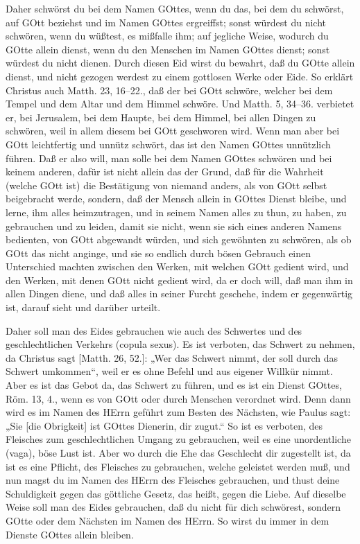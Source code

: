 Daher schwörst du bei dem Namen GOttes, wenn du das, bei dem du schwörst, auf GOtt beziehst und im Namen GOttes ergreiffst; sonst würdest du nicht schwören, wenn du wüßtest, es mißfalle ihm; auf jegliche Weise, wodurch du GOtte allein dienst, wenn du den Menschen im Namen GOttes dienst; sonst würdest du nicht dienen. Durch diesen Eid wirst du bewahrt, daß du GOtte allein dienst, und nicht gezogen werdest zu einem gottlosen Werke oder Eide. So erklärt Christus auch Matth. 23, 16–22., daß der bei GOtt schwöre, welcher bei dem Tempel und dem Altar und dem Himmel schwöre. Und Matth. 5, 34–36. verbietet er, bei Jerusalem, bei dem Haupte, bei dem Himmel, bei allen Dingen zu schwören, weil in allem diesem bei GOtt geschworen wird. Wenn man aber bei GOtt leichtfertig und unnütz schwört, das ist den Namen GOttes unnützlich führen. Daß er also will, man solle bei dem Namen GOttes schwören und bei keinem anderen, dafür ist nicht allein das der Grund, daß für die
Wahrheit (welche GOtt ist) die Bestätigung von niemand anders, als von GOtt selbst beigebracht werde, sondern, daß der Mensch allein in GOttes Dienst bleibe, und lerne, ihm alles heimzutragen, und in seinem Namen alles zu thun, zu haben, zu gebrauchen und zu leiden, damit sie nicht, wenn sie sich eines anderen Namens bedienten, von GOtt abgewandt würden, und sich gewöhnten zu schwören, als ob GOtt das nicht anginge, und sie so endlich durch bösen Gebrauch einen Unterschied machten zwischen den Werken, mit welchen GOtt gedient wird, und den Werken, mit denen GOtt nicht gedient wird, da er doch will, daß man ihm in allen Dingen diene, und daß alles in seiner Furcht geschehe, indem er gegenwärtig ist, darauf sieht und darüber urteilt.

Daher soll man des Eides gebrauchen wie auch des Schwertes und des geschlechtlichen Verkehrs (copula sexus). Es ist verboten, das Schwert zu nehmen, da Christus sagt [Matth. 26, 52.]: „Wer das Schwert nimmt, der soll durch das Schwert umkommen“, weil er es ohne Befehl und aus eigener Willkür nimmt. Aber es ist das Gebot da, das Schwert zu führen, und es ist ein Dienst GOttes, Röm. 13, 4., wenn es von GOtt oder durch Menschen verordnet wird. Denn dann wird es im Namen des HErrn geführt zum Besten des Nächsten, wie Paulus sagt: „Sie [die Obrigkeit] ist GOttes Dienerin, dir zugut.“ So ist es verboten, des Fleisches zum geschlechtlichen Umgang zu gebrauchen, weil es eine unordentliche (vaga), böse Lust ist. Aber wo durch die Ehe das Geschlecht dir zugestellt ist, da ist es eine Pflicht, des Fleisches zu gebrauchen, welche geleistet werden muß, und nun magst du im Namen des HErrn des Fleisches gebrauchen, und thust deine Schuldigkeit gegen das göttliche Gesetz, das heißt, gegen die Liebe. Auf dieselbe Weise soll man des Eides gebrauchen, daß du nicht für dich schwörest, sondern GOtte oder dem Nächsten im Namen des HErrn. So wirst du immer in dem Dienste GOttes allein bleiben.

